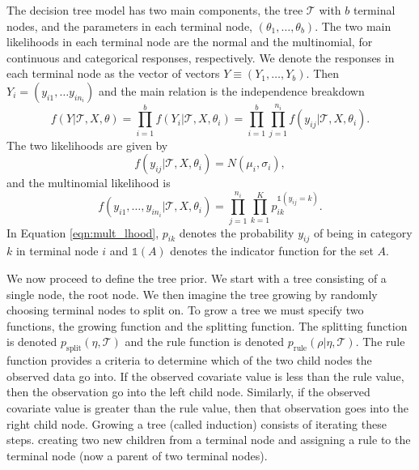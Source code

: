 The decision tree model has two main components, the tree $\mathcal{T}$ with $b$ terminal nodes, and the parameters in each terminal node, $(\theta_1,\dots,\theta_b)$. 
The two main likelihoods in each terminal node are the normal and the multinomial, for continuous and categorical responses, respectively. 
We denote the responses in each terminal node as the vector  of vectors $Y\equiv (Y_1, \dots, Y_b)$. Then $Y_i = (y_{i1}, \dots y_{in_i})$ and the main relation is the independence breakdown 
\begin{equation}
f(Y\vert \mathcal{T}, X, \theta) =\prod_{i=1}^b f(Y_i\vert \mathcal{T}, X, \theta_i) = \prod_{i=1}^b \prod_{j=1}^{n_i} f(y_{ij} \vert \mathcal{T}, X, \theta_i).
\end{equation}
The two likelihoods are given by
\begin{equation}
f(y_{ij} \vert \mathcal{T}, X, \theta_i) = N(\mu_i,\sigma_i),
\end{equation}
and the multinomial likelihood is
\begin{equation}\label{eqn:mult_lhood}
f(y_{i1}, \dots ,y_{in_i} \vert \mathcal{T}, X, \theta_i) = \prod_{j=1}^{n_i}\prod_{k=1}^K p_{ik}^{\mathds{1}(y_{ij}=k)}.
\end{equation}
In Equation \ref{eqn:mult_lhood}, $p_{ik}$ denotes the probability $y_{ij}$ of being in category $k$ in terminal node $i$ and $\mathds{1}(A)$ denotes the indicator function for the set $A$. 

We now proceed to define the tree prior. We start with a tree consisting of a single node, the root node. We then imagine the tree growing by randomly choosing terminal nodes to split on. To grow a tree we must specify two functions, the growing function and the splitting function.  The splitting function is denoted $p_{\text{split}}(\eta, \mathcal{T})$ and the rule function is denoted $p_{\text{rule}}(\rho \vert \eta, \mathcal{T})$. The rule function provides a criteria to determine which of the two child nodes the observed data go into. If the observed covariate value is less than the rule value, then the observation go into the left child node. Similarly, if the observed covariate value is greater than the rule value, then that observation goes into the right child node. Growing a tree (called induction) consists of iterating these steps. creating two new children from a terminal node and assigning a rule to the terminal node (now a parent of two terminal nodes). 

